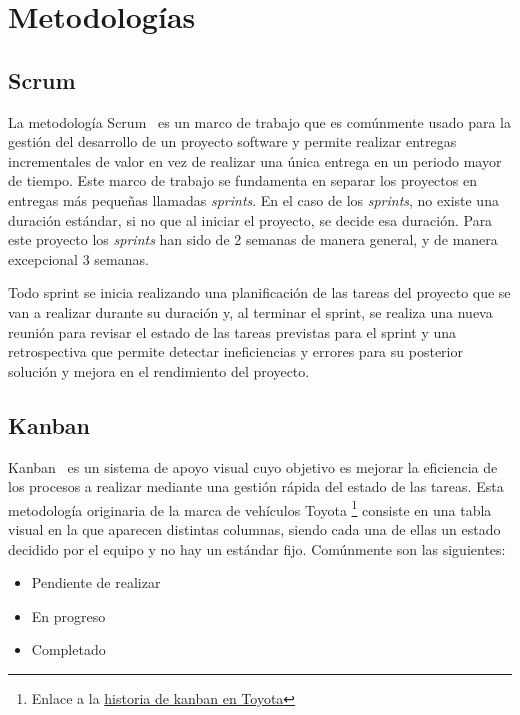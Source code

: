 
\section{Metodologías}

\subsection{Scrum}
La metodología Scrum~\cite{Scrum} es un marco de trabajo que es comúnmente usado para la gestión del desarrollo de un proyecto software y permite realizar entregas incrementales de valor en vez de realizar una única entrega en un periodo mayor de tiempo. Este marco de trabajo se fundamenta en separar los proyectos en entregas más pequeñas llamadas \textit{sprints}. En el caso de los \textit{sprints}, no existe una duración estándar, si no que al iniciar el proyecto, se decide esa duración. Para este proyecto los \textit{sprints} han sido de 2 semanas de manera general, y de manera excepcional 3 semanas.

Todo sprint se inicia realizando una planificación de las tareas del proyecto que se van a realizar durante su duración y, al terminar el sprint, se realiza una nueva reunión para revisar el estado de las tareas previstas para el sprint y una retrospectiva que permite detectar ineficiencias y errores para su posterior solución y mejora en el rendimiento del proyecto.

\subsection{Kanban}

Kanban~\cite{Kanban} es un sistema de apoyo visual cuyo objetivo es mejorar la eficiencia de los procesos a realizar mediante una gestión rápida del estado de las tareas. Esta metodología originaria de la marca de vehículos Toyota \footnote{Enlace a la \href{https://soka.gitlab.io/blog/post/2019-07-02-01-trello-origen-kanban-toyota-jit/}{ historia de kanban en Toyota}} consiste en una tabla visual en la que aparecen distintas columnas, siendo cada una de ellas un estado decidido por el equipo y no hay un estándar fijo. Comúnmente son las siguientes:
\begin{itemize}
    \item Pendiente de realizar
    \item En progreso
    \item Completado
\end{itemize}

